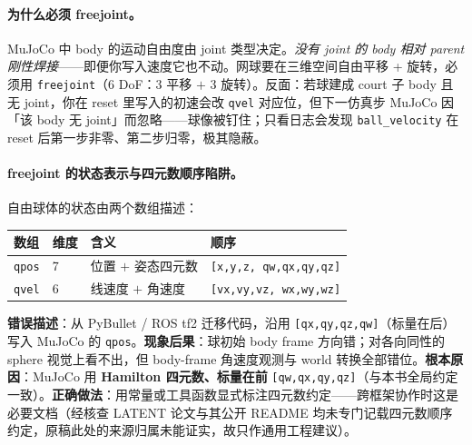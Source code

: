 \paragraph{为什么必须 freejoint。}MuJoCo 中 body 的运动自由度由 joint 类型决定。\emph{没有 joint 的 body 相对 parent 刚性焊接}——即便你写入速度它也不动。网球要在三维空间自由平移 + 旋转，必须用 \verb|freejoint|（$6$ DoF：$3$ 平移 $+$ $3$ 旋转）。反面：若球建成 court 子 body 且无 joint，你在 reset 里写入的初速会改 \verb|qvel| 对应位，但下一仿真步 MuJoCo 因「该 body 无 joint」而忽略——球像被钉住；只看日志会发现 \verb|ball_velocity| 在 reset 后第一步非零、第二步归零，极其隐蔽。

\paragraph{freejoint 的状态表示与四元数顺序陷阱。}自由球体的状态由两个数组描述：

\begin{center}
\small
\begin{tabular}{@{}llll@{}}
\toprule
数组 & 维度 & 含义 & 顺序 \\
\midrule
\verb|qpos| & 7 & 位置 $+$ 姿态四元数 & \verb|[x,y,z, qw,qx,qy,qz]| \\
\verb|qvel| & 6 & 线速度 $+$ 角速度 & \verb|[vx,vy,vz, wx,wy,wz]| \\
\bottomrule
\end{tabular}
\end{center}

\begin{pitfall}
\textbf{错误描述}：从 PyBullet / ROS tf2 迁移代码，沿用 \verb|[qx,qy,qz,qw]|（标量在后）写入 MuJoCo 的 \verb|qpos|。\textbf{现象后果}：球初始 body frame 方向错；对各向同性的 sphere 视觉上看不出，但 body-frame 角速度观测与 world 转换全部错位。\textbf{根本原因}：MuJoCo 用 \textbf{Hamilton 四元数、标量在前} \verb|[qw,qx,qy,qz]|（与本书全局约定一致）。\textbf{正确做法}：用常量或工具函数显式标注四元数约定——跨框架协作时这是必要文档（经核查 LATENT 论文与其公开 README 均未专门记载四元数顺序约定，原稿此处的来源归属未能证实，故只作通用工程建议）。
\end{pitfall}

